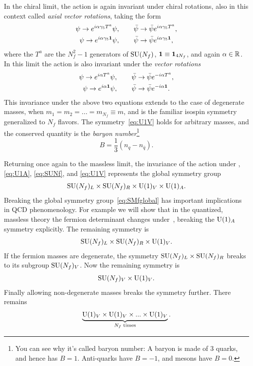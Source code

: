 In the chiral limit, the action  is again invariant under
chiral rotations, also in this context called {\it axial vector rotations},
taking the form
\begin{gather}
  \label{eq:SUNfc}
  \psi\to e^{i\alpha\gamma_5 T^a}\psi,\qquad
    \bar{\psi}\to\bar{\psi}e^{i\alpha\gamma_5 T^a}, \\
  \label{eq:U1A}
  \psi\to e^{i\alpha\gamma_5 {\mathbf 1}}\psi,\qquad
    \bar{\psi}\to\bar{\psi}e^{i\alpha\gamma_5 {\mathbf 1}},
\end{gather}
where the $T^a$ are the $N_f^2-1$ generators of $\operatorname{SU}(N_f)$,
${\mathbf 1}\equiv{\mathbf 1}_{4N_f}$, and again $\alpha\in\mathbb{R}$.
In this limit the action is also invariant under the
{\it vector rotations}
\begin{gather}
  \label{eq:SUNf}
  \psi\to e^{i\alpha T^a}\psi,\qquad
    \bar{\psi}\to\bar{\psi}e^{-i\alpha T^a}, \\
  \label{eq:U1V}
  \psi\to e^{i\alpha {\mathbf 1}}\psi,\qquad
    \bar{\psi}\to\bar{\psi}e^{-i\alpha {\mathbf 1}}.
\end{gather}
This invariance under the above two equations extends to the case of degenerate
masses, when $m_1=m_2=...=m_{N_f}\equiv m$, and is the familiar isospin
symmetry generalized to $N_f$ flavors. The symmetry~\eqref{eq:U1V} holds for
arbitrary masses, and the conserved quantity is the 
{\it baryon number}\footnote{You can see why it's called baryon number: 
A baryon is made of 3
quarks, and hence has $B=1$. Anti-quarks have $B=-1$, and
mesons have $B=0$.}
\begin{equation}
    B=\frac{1}{3}(n_q-n_{\bar{q}}).
\end{equation}


Returning once again to the massless limit, the invariance of the action under
, \eqref{eq:U1A}, \eqref{eq:SUNf}, and \eqref{eq:U1V}
represents the global symmetry group
\begin{equation}\label{eq:SMfglobal}
  \operatorname{SU}(N_f)_L\times\operatorname{SU}(N_f)_R\times\operatorname{U}(1)_V\times\operatorname{U}(1)_A.
\end{equation}
Breaking the global symmetry group~\eqref{eq:SMfglobal} has important
implications in QCD phenomenology. For example we will show that in the
quantized, massless theory the fermion determinant changes
under~, breaking the $\operatorname{U}(1)_A$ symmetry explicitly. The remaining
symmetry is
\begin{equation}\label{eq:SMglobalbUA}
  \operatorname{SU}(N_f)_L\times\operatorname{SU}(N_f)_R\times\operatorname{U}(1)_V.
\end{equation}
If the fermion masses are degenerate, the symmetry $\operatorname{SU}(N_f)_L\times\operatorname{SU}(N_f)_R$
breaks to its subgroup $\operatorname{SU}(N_f)_V$. Now the remaining symmetry is
\begin{equation}
  \operatorname{SU}(N_f)_V\times\operatorname{U}(1)_V.
\end{equation}
Finally allowing non-degenerate masses breaks the symmetry further.
There remains
\begin{equation}
  \underbrace{\operatorname{U}(1)_V\times\operatorname{U}(1)_V\times...\times\operatorname{U}(1)_V}_\text{$N_f$ times}.
\end{equation}


